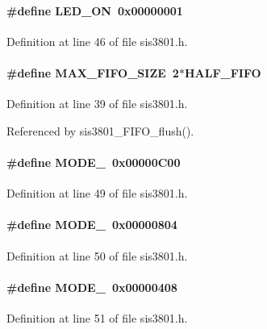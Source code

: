 \paragraph[{LED\_\-ON}]{\setlength{\rightskip}{0pt plus 5cm}\#define LED\_\-ON~0x00000001}\hfill\label{sis3801_8h_af2e697ac60e05813d45ea2c9c9e79c25}


Definition at line 46 of file sis3801.h.
\paragraph[{MAX\_\-FIFO\_\-SIZE}]{\setlength{\rightskip}{0pt plus 5cm}\#define MAX\_\-FIFO\_\-SIZE~2$\ast$HALF\_\-FIFO}\hfill\label{sis3801_8h_a70781c406c17458a408f41de8605edfd}


Definition at line 39 of file sis3801.h.

Referenced by sis3801\_\-FIFO\_\-flush().
\paragraph[{MODE\_\-0}]{\setlength{\rightskip}{0pt plus 5cm}\#define MODE\_~0x00000C00}\hfill\label{sis3801_8h_adc4559afdb0535cfebadef1c707a2f91}


Definition at line 49 of file sis3801.h.
\paragraph[{MODE\_\-1}]{\setlength{\rightskip}{0pt plus 5cm}\#define MODE\_~0x00000804}\hfill\label{sis3801_8h_adaf03329d7f4a4ac6ac043bf481db786}


Definition at line 50 of file sis3801.h.
\paragraph[{MODE\_\-2}]{\setlength{\rightskip}{0pt plus 5cm}\#define MODE\_~0x00000408}\hfill\label{sis3801_8h_aced5757ab7a0d940fced00f3dd123fa3}


Definition at line 51 of file sis3801.h.
